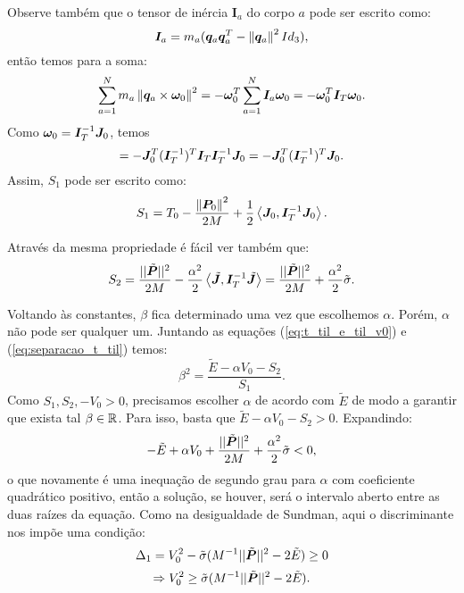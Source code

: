 Observe também que o tensor de inércia $\bm I_a$ do corpo $a$ pode ser escrito como:
$$
\bm I_a = m_a (\bm q_a \bm q_a^T - \left\Vert \bm q_a \right\Vert^2 Id_3),
$$
então temos para a soma:
$$
\sum_{a=1}^N m_a \left\Vert \bm q_a \times \bm \omega_0 \right\Vert^2
= - \bm \omega_0^T \sum_{a=1}^N \bm I_a \bm \omega_0
= - \bm \omega_0^T \bm I_T \bm \omega_0.
$$
Como $\bm \omega_0 = \bm I_T^{-1} \bm J_0$, temos
$$
= - \bm J_0^T (\bm I_T^{-1})^T \bm I_T \bm I_T^{-1} \bm J_0
= - \bm J_0^T (\bm I_T^{-1})^T \bm J_0.
$$
Assim, $S_1$ pode ser escrito como:
\begin{equation}\label{eq:S_1}
    S_1 = T_0 - \dfrac{\left\Vert \bm P_0 \right\Vert^2}{2 M} + \dfrac{1}{2} \left\langle \bm J_0, \bm I_T^{-1} \bm J_0 \right\rangle.
\end{equation}

Através da mesma propriedade é fácil ver também que:
\begin{equation}\label{eq:S_2}
    S_2 = \dfrac{||\tilde{\bm P}||^2}{2M} - \dfrac{\alpha^2}{2} \left\langle \tilde{\bm J}, \bm I_T^{-1} \tilde{\bm J} \right\rangle = \dfrac{||\tilde{\bm P}||^2}{2M} + \dfrac{\alpha^2}{2} \tilde{\sigma}.
\end{equation}

Voltando às constantes, $\beta$ fica determinado uma vez que escolhemos $\alpha$. Porém, $\alpha$ não pode ser qualquer um. Juntando as equações (\ref{eq:t_til_e_til_v0}) e (\ref{eq:separacao_t_til}) temos:
\begin{equation}\label{eq:beta1}
    \beta^2 = \dfrac{\tilde E - \alpha V_0 - S_2}{S_1}.
\end{equation}
Como $S_1, S_2, - V_0 > 0$, precisamos escolher $\alpha$ de acordo com $\tilde E$ de modo a garantir que exista tal $\beta \in \mathbb{R}$. Para isso, basta que $\tilde E - \alpha V_0 - S_2 > 0$. Expandindo:
\begin{equation}\label{eq:inequacao_delta1}
    -\tilde E + \alpha V_0 + \dfrac{||\tilde{\bm P}||^2}{2M} + \dfrac{\alpha^2}{2} \tilde \sigma < 0,
\end{equation}
o que novamente é uma inequação de segundo grau para $\alpha$ com coeficiente quadrático positivo, então a solução, se houver, será o intervalo aberto entre as duas raízes da equação. Como na desigualdade de Sundman, aqui o discriminante nos impõe uma condição:
\begin{equation}
    \Delta_1 = V_0^2 - \tilde \sigma (M^{-1} ||\tilde{\bm P}||^2 - 2 \tilde E) \geq 0
\end{equation}
\begin{equation}\label{eq:restricao_delta1}
    \Rightarrow
    V_0^2 \geq \tilde{\sigma} (M^{-1} ||\tilde{\bm P}||^2 - 2 \tilde E).
\end{equation}

